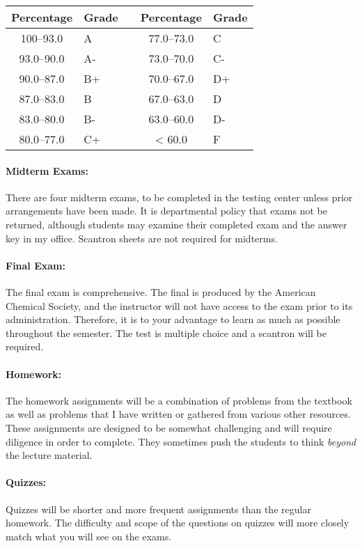 \documentclass[12pt, letterpaper]{article}
\begin{document}
\begin{tabular}{cl|c|cl}
	Percentage & Grade &  & Percentage & Grade \\ \midrule
	100--93.0  & A     &  & 77.0--73.0 & C     \\
	93.0--90.0 & A-    &  & 73.0--70.0 & C-    \\
	90.0--87.0 & B+    &  & 70.0--67.0 & D+    \\
	87.0--83.0 & B     &  & 67.0--63.0 & D     \\
	83.0--80.0 & B-    &  & 63.0--60.0 & D-    \\
	80.0--77.0 & C+    &  & < 60.0     & F
\end{tabular}
\paragraph{Midterm Exams:}
There are four midterm exams, to be completed in the testing center unless prior arrangements have been made. It is departmental policy that exams not be returned, although students may examine their completed exam and the answer key in my office. Scantron sheets are not required for midterms.

\paragraph{Final Exam:}
The final exam is comprehensive. The final is produced by the American Chemical Society, and the instructor will not have access to the exam prior to its administration. Therefore, it is to your advantage to learn as much as possible throughout the semester. The test is multiple choice and a scantron will be required.

\paragraph{Homework:}
The homework assignments will be a combination of problems from the textbook as well as problems that I have written or gathered from various other resources. These assignments are designed to be somewhat challenging and will require diligence in order to complete. They sometimes push the students to think \emph{beyond} the lecture material.

\paragraph{Quizzes:}
Quizzes will be shorter and more frequent assignments than the regular homework. The difficulty and scope of the questions on quizzes will more closely match what you will see on the exams.
\end{document}
